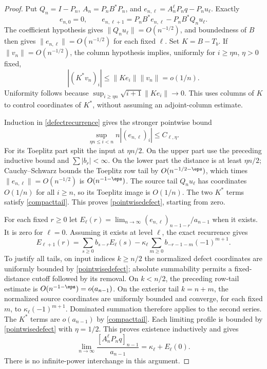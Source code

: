 \begin{proof}
Put $Q_n=I-P_n$, $A_n=P_nB^*P_n$, and
$e_{n,\ell}=A_n^\ell P_nq-P_nu_\ell$. Exactly
\begin{equation}\label{defectrecurrence}
 e_{n,0}=0,\qquad
 e_{n,\ell+1}=P_nB^*e_{n,\ell}-P_nB^*Q_nu_\ell.
\end{equation}
The coefficient hypothesis gives $\|Q_nu_\ell\|=O(n^{-1/2})$,
and boundedness of $B$ then gives
$\|e_{n,\ell}\|=O(n^{-1/2})$ for each fixed $\ell$.
Set $K=B-T_b$. If $\|v_n\|=O(n^{-1/2})$, the column hypothesis
implies, uniformly for $i\ge\eta n$, $\eta>0$ fixed,
\begin{equation}\label{compacttail}
 |(K^*v_n)_i|\le\|Ke_i\|\|v_n\|=o(1/n).
\end{equation}
Uniformity follows because
$\sup_{i\ge\eta n}\sqrt{i+1}\|Ke_i\|\to0$.
This uses columns of $K$ to control coordinates of $K^*$, without
assuming an adjoint-column estimate.

Induction in \eqref{defectrecurrence} gives the stronger pointwise bound
\begin{equation}\label{pointwisedefect}
 \sup_{\eta n\le i<n}n|(e_{n,\ell})_i|\le C_{\ell,\eta}.
\end{equation}
For its Toeplitz part split the input at $\eta n/2$. On the upper
part use the preceding inductive bound and $\sum|b_r|<\infty$.
On the lower part the distance is at least $\eta n/2$;
Cauchy--Schwarz bounds the Toeplitz row tail by
$O(n^{-1/2-\eps})$, which times $\|e_{n,\ell}\|=O(n^{-1/2})$
is $O(n^{-1-\eps})$. The source tail $Q_nu_\ell$ has coordinates
$O(1/n)$ for all $i\ge n$, so its Toeplitz image is $O(1/n)$.
The two $K^*$ terms satisfy \eqref{compacttail}. This proves
\eqref{pointwisedefect}, starting from zero.

For each fixed $r\ge0$ let
$E_\ell(r)=\lim_{n\to\infty}(e_{n,\ell})_{n-1-r}/a_{n-1}$
when it exists. It is zero for $\ell=0$. Assuming it exists at
level $\ell$, the exact recurrence gives
\begin{equation}\label{edgeprofile}
 E_{\ell+1}(r)=\sum_{s\ge0}b_{s-r}E_\ell(s)
       -\kappa_\ell\sum_{m\ge0}b_{-r-1-m}(-1)^{m+1}.
\end{equation}
To justify all tails, on input indices $k\ge n/2$ the normalized
defect coordinates are uniformly bounded by \eqref{pointwisedefect};
absolute summability permits a fixed-distance cutoff followed by its
removal. On $k<n/2$, the preceding row-tail estimate is
$O(n^{-1-\eps})=o(a_{n-1})$. On the exterior tail $k=n+m$, the
normalized source coordinates are uniformly bounded and converge,
for each fixed $m$, to $\kappa_\ell(-1)^{m+1}$. Dominated summation
therefore applies to the second series. The $K^*$ terms are
$o(a_{n-1})$ by \eqref{compacttail}. Each limiting profile is bounded
by \eqref{pointwisedefect} with $\eta=1/2$.
This proves existence inductively and gives
\[
 \lim_{n\to\infty}\frac{[A_n^\ell P_nq]_{n-1}}{a_{n-1}}
       =\kappa_\ell+E_\ell(0).
\]
There is no infinite-power interchange in this argument.
\end{proof}

